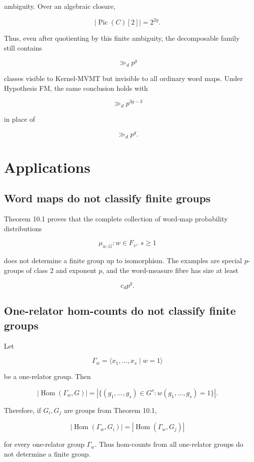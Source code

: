 \documentclass[11pt]{article}
\begin{document}
ambiguity. Over an algebraic closure,

\[
|\operatorname{Pic}(C)[2]|=2^{2g}.
\]

Thus, even after quotienting by this finite ambiguity, the decomposable family still contains

\[
\gg_d p^g
\]

classes visible to Kernel-MVMT but invisible to all ordinary word maps. Under Hypothesis FM, the same conclusion holds with

\[
\gg_d p^{3g-3}
\]

in place of

\[
\gg_d p^g.
\]

\section{Applications}

\subsection{Word maps do not classify finite groups}

Theorem 10.1 proves that the complete collection of word-map probability distributions

\[
{\mu_{w,G}:w\in F_s,\ s\ge1}
\]

does not determine a finite group up to isomorphism. The examples are special $p$-groups of class $2$ and exponent $p$, and the word-measure fibre has size at least

\[
c_d p^g.
\]

\subsection{One-relator hom-counts do not classify finite groups}

Let

\[
\Gamma_w=\langle x_1,\ldots,x_s\mid w=1\rangle
\]

be a one-relator group. Then

\[
|\operatorname{Hom}(\Gamma_w,G)|
=|\{(g_1,\ldots,g_s)\in G^s:w(g_1,\ldots,g_s)=1\}|.
\]

Therefore, if $G_i,G_j$ are groups from Theorem 10.1,

\[
|\operatorname{Hom}(\Gamma_w,G_i)|
=|\operatorname{Hom}(\Gamma_w,G_j)|
\]

for every one-relator group $\Gamma_w$. Thus hom-counts from all one-relator groups do not determine a finite group.
\end{document}
